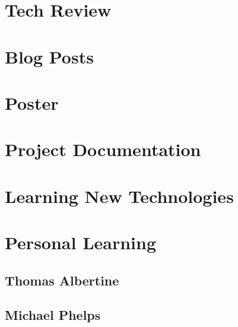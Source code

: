 \documentclass[letterpaper,10pt, onecolumn, draftclsnofoot]{IEEEtran}
\begin{document}
\section{Tech Review}

\section{Blog Posts}

\section{Poster}

\section{Project Documentation}

\section{Learning New Technologies}

\section{Personal Learning}
\subsection{Thomas Albertine}

\subsection{Michael Phelps}


\end{document}

